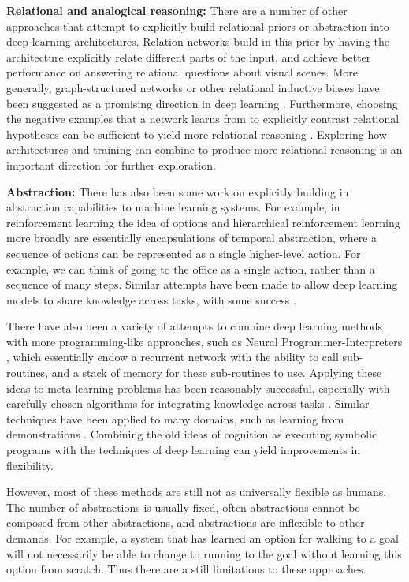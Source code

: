 \documentclass[11pt]{article}
\begin{document}
\textbf{Relational and analogical reasoning:} There are a number of other approaches that attempt to explicitly build relational priors or abstraction into deep-learning architectures. Relation networks \citep{Santoro2017} build in this prior by having the architecture explicitly relate different parts of the input, and achieve better performance on answering relational questions about visual scenes. More generally, graph-structured networks or other relational inductive biases have been suggested as a promising direction in deep learning \citep{Battaglia2018}. Furthermore, choosing the negative examples that a network learns from to explicitly contrast relational hypotheses can be sufficient to yield more relational reasoning \citep{Hill2019}. Exploring how architectures and training can combine to produce more relational reasoning is an important direction for further exploration. \par
\textbf{Abstraction:} There has also been some work on explicitly building in abstraction capabilities to machine learning systems. For example, in reinforcement learning the idea of options \citep{Sutton1999} and hierarchical reinforcement learning more broadly \citep[e.g.]{Botvinick2009} are essentially encapsulations of temporal abstraction, where a sequence of actions can be represented as a single higher-level action. For example, we can think of going to the office as a single action, rather than a sequence of many steps. Similar attempts have been made to allow deep learning models to share knowledge across tasks, with some success \citep[e.g.]{Tessler2016}. \par 
There have also been a variety of attempts to combine deep learning methods with more programming-like approaches, such as Neural Programmer-Interpreters \citep{Reed2015}, which essentially endow a recurrent network with the ability to call sub-routines, and a stack of memory for these sub-routines to use. Applying these ideas to meta-learning problems has been reasonably successful, especially with carefully chosen algorithms for integrating knowledge across tasks \citep{Devlin2017}. Similar techniques have been applied to many domains, such as learning from demonstrations \citep[e.g.]{Xu2017a}. Combining the old ideas of cognition as executing symbolic programs \citep{Newell1961} with the techniques of deep learning can yield improvements in flexibility. \par  
However, most of these methods are still not as universally flexible as humans. The number of abstractions is usually fixed, often abstractions cannot be composed from other abstractions, and abstractions are inflexible to other demands. For example, a system that has learned an option for walking to a goal will not necessarily be able to change to running to the goal without learning this option from scratch. Thus there are a still limitations to these approaches. \par 
\end{document}
